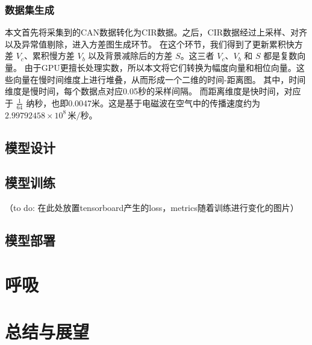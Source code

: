 \subsection{数据集生成}
本文首先将采集到的CAN数据转化为CIR数据。之后，CIR数据经过上采样、对齐以及异常值剔除，进入方差图生成环节。
在这个环节，我们得到了更新累积快方差 \(V_c\)、累积慢方差 \(V_b\) 以及背景减除后的方差 \(S\)。这三者 \(V_c\)、\(V_b\) 和 \(S\) 都是复数向量。
由于GPU更擅长处理实数，所以本文将它们转换为幅度向量和相位向量。这些向量在慢时间维度上进行堆叠，从而形成一个二维的时间-距离图。
其中，时间维度是慢时间，每个数据点对应0.05秒的采样间隔。
而距离维度是快时间，对应于 \( \frac{1}{64} \) 纳秒，也即0.0047米。这是基于电磁波在空气中的传播速度约为 \(2.99792458 \times 10^8 \, \text{米/秒}\)。


\section{模型设计}
\section{模型训练}
（to do: 在此处放置tensorboard产生的loss，metrics随着训练进行变化的图片）

\section{模型部署}





\chapter{呼吸}

\chapter{总结与展望}




